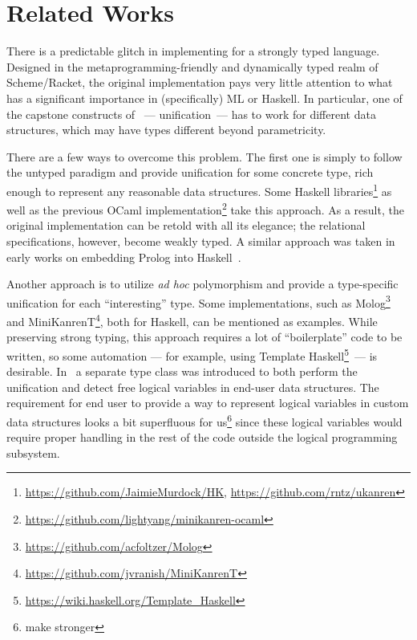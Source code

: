 \section{Related Works}
\label{sec:relworks}

There is a predictable glitch in implementing \miniKanren for a strongly typed language.
Designed in the metaprogramming-friendly and dynamically typed realm of Scheme/Racket, the original
\miniKanren implementation pays very little attention to what has a significant importance in (specifically)
ML or Haskell. In particular, one of the capstone constructs of \miniKanren~--- unification~--- has to work for
different data structures, which may have types different beyond parametricity.

There are a few ways to overcome this problem. The first one is simply to follow the untyped paradigm and
provide unification for some concrete type, rich enough to represent any reasonable data structures.
Some Haskell \miniKanren libraries\footnote{\url{https://github.com/JaimieMurdock/HK}, \url{https://github.com/rntz/ukanren}}
as well as the previous OCaml implementation\footnote{\url{https://github.com/lightyang/minikanren-ocaml}} take this approach.
As a result, the original implementation can be retold with all its elegance; the relational specifications, however,
become weakly typed. A similar approach was taken in early works on embedding Prolog into Haskell~\cite{PrologInHaskell}.

Another approach is to utilize \emph{ad hoc} polymorphism and provide a type-specific unification for each ``interesting'' type.
Some \miniKanren implementations, such as Molog\footnote{\url{https://github.com/acfoltzer/Molog}} and
MiniKanrenT\footnote{\url{https://github.com/jvranish/MiniKanrenT}}, both for Haskell, can be mentioned as examples.
While preserving strong typing, this approach requires a lot of ``boilerplate''
code to be written, so some automation --- for example, using 
Template Haskell\footnote{\url{https://wiki.haskell.org/Template_Haskell}}~\cite{SheardTMH}---
is desirable. In~\cite{TypedLogicalVariables} a separate type class was introduced to both perform the unification
and detect free logical variables in end-user data structures. The requirement for end user to provide a way to represent
logical variables in custom data structures looks a bit superfluous for us\footnote{make stronger} since these logical variables would require proper
handling in the rest of the code outside the logical programming subsystem.

